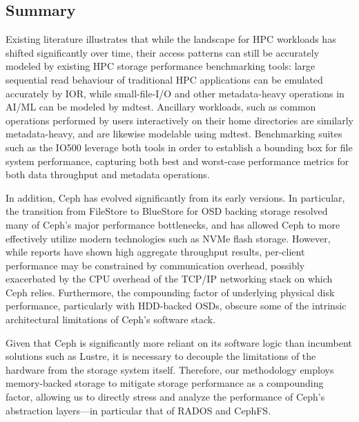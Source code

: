 \subsection*{Summary}

Existing literature illustrates that while the landscape for \ac{HPC} workloads has shifted significantly over time, their access patterns can still be accurately modeled by existing \ac{HPC} storage performance benchmarking tools: large sequential read behaviour of traditional \ac{HPC} applications can be emulated accurately by \ac{IOR}, while small-file-\acs{I/O} and other metadata-heavy operations in \ac{AI}/\ac{ML} can be modeled by mdtest. Ancillary workloads, such as common operations performed by users interactively on their home directories are similarly metadata-heavy, and are likewise modelable using mdtest. Benchmarking suites such as the IO500 leverage both tools in order to establish a bounding box for file system performance, capturing both best and worst-case performance metrics for both data throughput and metadata operations.

In addition, Ceph has evolved significantly from its early versions. In particular, the transition from FileStore to BlueStore for \ac{OSD} backing storage resolved many of Ceph's major performance bottlenecks, and has allowed Ceph to more effectively utilize modern technologies such as \ac{NVMe} flash storage. However, while reports have shown high aggregate throughput results, per-client performance may be constrained by communication overhead, possibly exacerbated by the \ac{CPU} overhead of the \ac{TCP/IP} networking stack on which Ceph relies. Furthermore, the compounding factor of underlying physical disk performance, particularly with \acs{HDD}-backed \acp{OSD}, obscure some of the intrinsic architectural limitations of Ceph's software stack. 

Given that Ceph is significantly more reliant on its software logic than incumbent solutions such as Lustre, it is necessary to decouple the limitations of the hardware from the storage system itself. Therefore, our methodology employs memory-backed storage to mitigate storage performance as a compounding factor, allowing us to directly stress and analyze the performance of Ceph's abstraction layers---in particular that of \ac{RADOS} and \ac{CephFS}.